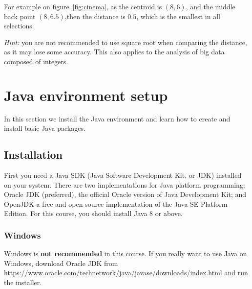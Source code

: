 \documentclass[11pt,a4paper]{article}
\begin{document}
For example  on figure~\ref{fig:cinema}, as the centroid is $(8,6)$, and the middle back point $(8, 6.5)$,then the distance is $0.5$, which is the smallest in all selections. \medskip

{\em Hint:} you are not recommended to use square root when comparing the distance, as it may lose some accuracy. This also applies to the  analysis of big data composed of integers.

\section{Java environment setup}

In this section we install the Java environment and learn how to create and install basic Java packages.

\subsection{Installation}

First you need a Java SDK (Java Software Development Kit, or JDK) installed on your system. There are two implementations for Java platform programming: Oracle JDK (preferred), the official Oracle version of Java Development Kit; and OpenJDK  a free and open-source implementation of the Java SE Platform Edition. For this course, you should install Java 8 or above.

\subsubsection{Windows}
Windows is {\bf not recommended} in this course. If you really want to use Java on Windows,  download Oracle JDK from \url{https://www.oracle.com/technetwork/java/javase/downloads/index.html} and run the installer.
\end{document}
